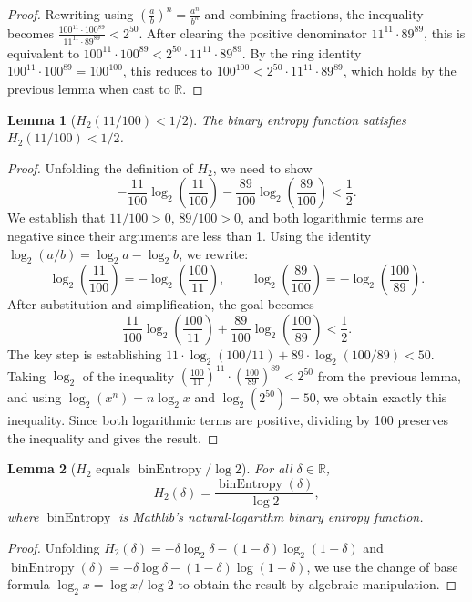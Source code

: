 \documentclass[11pt]{article}
\theoremstyle{plain}
\newtheorem*{lemma}{Lemma}
\theoremstyle{definition}
\theoremstyle{remark}
\begin{document}
\begin{proof}
Rewriting using $\left(\frac{a}{b}\right)^n = \frac{a^n}{b^n}$ and combining fractions, the inequality becomes $\frac{100^{11} \cdot 100^{89}}{11^{11} \cdot 89^{89}} < 2^{50}$. After clearing the positive denominator $11^{11} \cdot 89^{89}$, this is equivalent to $100^{11} \cdot 100^{89} < 2^{50} \cdot 11^{11} \cdot 89^{89}$. By the ring identity $100^{11} \cdot 100^{89} = 100^{100}$, this reduces to $100^{100} < 2^{50} \cdot 11^{11} \cdot 89^{89}$, which holds by the previous lemma when cast to $\mathbb{R}$.
\end{proof}

\begin{lemma}[$H_2(11/100) < 1/2$]
The binary entropy function satisfies $H_2(11/100) < 1/2$.
\end{lemma}

\begin{proof}
Unfolding the definition of $H_2$, we need to show
\[
-\frac{11}{100}\log_2\!\left(\frac{11}{100}\right) - \frac{89}{100}\log_2\!\left(\frac{89}{100}\right) < \frac{1}{2}.
\]
We establish that $11/100 > 0$, $89/100 > 0$, and both logarithmic terms are negative since their arguments are less than 1. Using the identity $\log_2(a/b) = \log_2 a - \log_2 b$, we rewrite:
\[
\log_2\!\left(\frac{11}{100}\right) = -\log_2\!\left(\frac{100}{11}\right), \qquad \log_2\!\left(\frac{89}{100}\right) = -\log_2\!\left(\frac{100}{89}\right).
\]
After substitution and simplification, the goal becomes
\[
\frac{11}{100}\log_2\!\left(\frac{100}{11}\right) + \frac{89}{100}\log_2\!\left(\frac{100}{89}\right) < \frac{1}{2}.
\]
The key step is establishing $11 \cdot \log_2(100/11) + 89 \cdot \log_2(100/89) < 50$. Taking $\log_2$ of the inequality $\left(\frac{100}{11}\right)^{11}\cdot\left(\frac{100}{89}\right)^{89} < 2^{50}$ from the previous lemma, and using $\log_2(x^n) = n\log_2 x$ and $\log_2(2^{50}) = 50$, we obtain exactly this inequality. Since both logarithmic terms are positive, dividing by 100 preserves the inequality and gives the result.
\end{proof}

\begin{lemma}[$H_2$ equals $\operatorname{binEntropy} / \log 2$]
For all $\delta \in \mathbb{R}$,
\[
H_2(\delta) = \frac{\operatorname{binEntropy}(\delta)}{\log 2},
\]
where $\operatorname{binEntropy}$ is Mathlib's natural-logarithm binary entropy function.
\end{lemma}

\begin{proof}
Unfolding $H_2(\delta) = -\delta\log_2\delta - (1-\delta)\log_2(1-\delta)$ and $\operatorname{binEntropy}(\delta) = -\delta\log\delta - (1-\delta)\log(1-\delta)$, we use the change of base formula $\log_2 x = \log x / \log 2$ to obtain the result by algebraic manipulation.
\end{proof}
\end{document}

